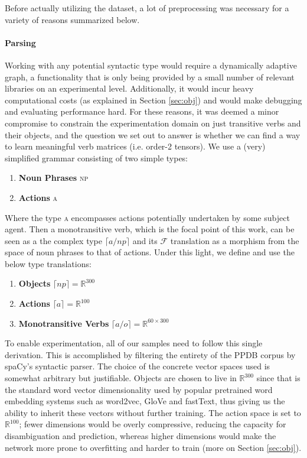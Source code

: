 \documentclass[a4paper,11pt]{article}
\begin{document}
Before actually utilizing the dataset, a lot of preprocessing was necessary for a variety of reasons summarized below.
\paragraph{Parsing} Working with any potential syntactic type would require a dynamically adaptive graph, a functionality that is only being provided by a small number of relevant libraries on an experimental level. Additionally, it would incur heavy computational costs (as explained in Section \ref{sec:obj}) and would make debugging and evaluating performance hard. For these reasons, it was deemed a minor compromise to constrain the experimentation domain on just transitive verbs and their objects, and the question we set out to answer is whether we can find a way to learn meaningful verb matrices (i.e. order-2 tensors). We use a (very) simplified grammar consisting of two simple types:
\begin{enumerate}
\item{\textbf{Noun Phrases}} \textsc{np}
\item{\textbf{Actions}} \textsc{a}
\end{enumerate}

Where the type \textsc{a} encompasses actions potentially undertaken by some subject agent. Then a monotransitive verb, which is the focal point of this work, can be seen as a the complex type $\lceil a/np \rceil$ and its $\mathcal{F}$ translation as a morphism from the space of noun phrases to that of actions. Under this light, we define and use the below type translations:
\begin{enumerate}
\item{\textbf{Objects}} $\lceil np \rceil = \mathbb{R}^{300}$
\item{\textbf{Actions}} $\lceil a \rceil = \mathbb{R}^{100}$
\item{\textbf{Monotransitive Verbs}} $\lceil a/o \rceil = \mathbb{R}^{60\times 300}$
\end{enumerate}

To enable experimentation, all of our samples need to follow this single derivation. This is accomplished by filtering the entirety of the PPDB corpus by spaCy's syntactic parser. The choice of the concrete vector spaces used is somewhat arbitrary but justifiable. Objects are chosen to live in $\mathbb{R}^{300}$ since that is the standard word vector dimensionality used by popular pretrained word embedding systems such as word2vec, GloVe and fastText, thus giving us the ability to inherit these vectors without further training. The action space is set to $\mathbb{R}^{100}$; fewer dimensions would be overly compressive, reducing the capacity for disambiguation and prediction, whereas higher dimensions would make the network more prone to overfitting and harder to train (more on Section \ref{sec:obj}).
\end{document}
